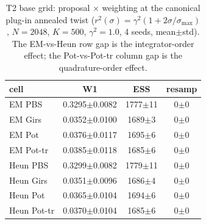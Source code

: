 \begin{table}[ht]
\centering
\caption{T2 base grid: proposal $\times$ weighting at the canonical plug-in annealed twist ($r^2(\sigma)=\gamma^2(1+2\sigma/\sigma_{\max})$, $N=2048$, $K=500$, $\gamma^2=1.0$, 4 seeds, mean$\pm$std). The EM-vs-Heun row gap is the integrator-order effect; the Pot-vs-Pot-tr column gap is the quadrature-order effect.}
\label{tab:toy_t2}
\begin{tabular}{lccc}
\toprule
cell & W1 & ESS & resamp \\
\midrule
EM PBS & 0.3295$\pm$0.0082 & 1777$\pm$11 & 0$\pm$0 \\
EM Girs & 0.0352$\pm$0.0100 & 1689$\pm$3 & 0$\pm$0 \\
EM Pot & 0.0376$\pm$0.0117 & 1695$\pm$6 & 0$\pm$0 \\
EM Pot-tr & 0.0385$\pm$0.0118 & 1685$\pm$6 & 0$\pm$0 \\
Heun PBS & 0.3299$\pm$0.0082 & 1779$\pm$11 & 0$\pm$0 \\
Heun Girs & 0.0351$\pm$0.0096 & 1686$\pm$4 & 0$\pm$0 \\
Heun Pot & 0.0365$\pm$0.0104 & 1694$\pm$6 & 0$\pm$0 \\
Heun Pot-tr & 0.0370$\pm$0.0104 & 1685$\pm$6 & 0$\pm$0 \\
\bottomrule
\end{tabular}
\end{table}
